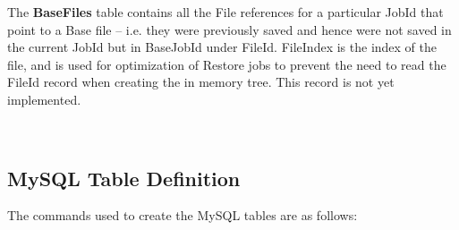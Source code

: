 {{{\begin{longtable}{|l|l|l|}
\end{longtable}

The {\bf BaseFiles} table contains all the File references for a particular
JobId that point to a Base file -- i.e. they were previously saved and hence
were not saved in the current JobId but in BaseJobId under FileId. FileIndex
is the index of the file, and is used for optimization of Restore jobs to
prevent the need to read the FileId record when creating the in memory tree.
This record is not yet implemented.

\

\subsection{MySQL Table Definition}

The commands used to create the MySQL tables are as follows:

}}}
